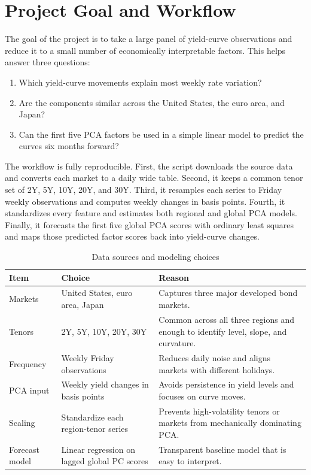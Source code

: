 \documentclass[11pt]{article}
\begin{document}
\section{Project Goal and Workflow}

The goal of the project is to take a large panel of yield-curve observations and reduce it to a small number of economically interpretable factors. This helps answer three questions:

\begin{enumerate}
\item Which yield-curve movements explain most weekly rate variation?
\item Are the components similar across the United States, the euro area, and Japan?
\item Can the first five PCA factors be used in a simple linear model to predict the curves six months forward?
\end{enumerate}

The workflow is fully reproducible. First, the script downloads the source data and converts each market to a daily wide table. Second, it keeps a common tenor set of 2Y, 5Y, 10Y, 20Y, and 30Y. Third, it resamples each series to Friday weekly observations and computes weekly changes in basis points. Fourth, it standardizes every feature and estimates both regional and global PCA models. Finally, it forecasts the first five global PCA scores with ordinary least squares and maps those predicted factor scores back into yield-curve changes.

\begin{table}[htbp]
\centering
\caption{Data sources and modeling choices}
\small
\begin{tabular}{p{1.25in}p{2.55in}p{2.4in}}
\toprule
Item & Choice & Reason \\
\midrule
Markets & United States, euro area, Japan & Captures three major developed bond markets. \\
Tenors & 2Y, 5Y, 10Y, 20Y, 30Y & Common across all three regions and enough to identify level, slope, and curvature. \\
Frequency & Weekly Friday observations & Reduces daily noise and aligns markets with different holidays. \\
PCA input & Weekly yield changes in basis points & Avoids persistence in yield levels and focuses on curve moves. \\
Scaling & Standardize each region-tenor series & Prevents high-volatility tenors or markets from mechanically dominating PCA. \\
Forecast model & Linear regression on lagged global PC scores & Transparent baseline model that is easy to interpret. \\
\bottomrule
\end{tabular}
\end{table}
\end{document}
